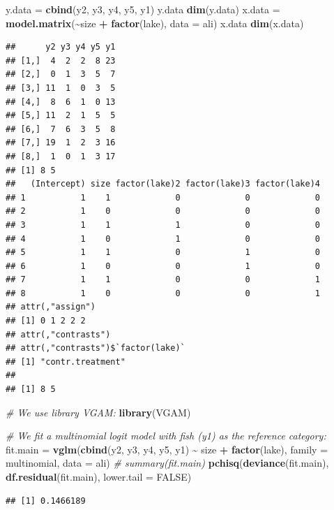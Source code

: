 \documentclass[
  ignorenonframetext,
]{beamer}
\newenvironment{Shaded}{\begin{snugshade}}{\end{snugshade}}
\newcommand{\AttributeTok}[1]{\textcolor[rgb]{0.13,0.29,0.53}{#1}}
\newcommand{\CommentTok}[1]{\textcolor[rgb]{0.56,0.35,0.01}{\textit{#1}}}
\newcommand{\ConstantTok}[1]{\textcolor[rgb]{0.56,0.35,0.01}{#1}}
\newcommand{\FunctionTok}[1]{\textcolor[rgb]{0.13,0.29,0.53}{\textbf{#1}}}
\newcommand{\NormalTok}[1]{#1}
\newcommand{\OtherTok}[1]{\textcolor[rgb]{0.56,0.35,0.01}{#1}}
\newcommand{\SpecialCharTok}[1]{\textcolor[rgb]{0.81,0.36,0.00}{\textbf{#1}}}
\begin{document}
\begin{frame}[fragile]
\begin{Shaded}
\begin{Highlighting}[]
\NormalTok{y.data }\OtherTok{=} \FunctionTok{cbind}\NormalTok{(y2, y3, y4, y5, y1)}
\NormalTok{y.data}
\FunctionTok{dim}\NormalTok{(y.data)}
\NormalTok{x.data }\OtherTok{=} \FunctionTok{model.matrix}\NormalTok{(}\SpecialCharTok{\textasciitilde{}}\NormalTok{size }\SpecialCharTok{+} \FunctionTok{factor}\NormalTok{(lake), }\AttributeTok{data =}\NormalTok{ ali)}
\NormalTok{x.data}
\FunctionTok{dim}\NormalTok{(x.data)}
\end{Highlighting}
\end{Shaded}

\begin{verbatim}
##      y2 y3 y4 y5 y1
## [1,]  4  2  2  8 23
## [2,]  0  1  3  5  7
## [3,] 11  1  0  3  5
## [4,]  8  6  1  0 13
## [5,] 11  2  1  5  5
## [6,]  7  6  3  5  8
## [7,] 19  1  2  3 16
## [8,]  1  0  1  3 17
## [1] 8 5
##   (Intercept) size factor(lake)2 factor(lake)3 factor(lake)4
## 1           1    1             0             0             0
## 2           1    0             0             0             0
## 3           1    1             1             0             0
## 4           1    0             1             0             0
## 5           1    1             0             1             0
## 6           1    0             0             1             0
## 7           1    1             0             0             1
## 8           1    0             0             0             1
## attr(,"assign")
## [1] 0 1 2 2 2
## attr(,"contrasts")
## attr(,"contrasts")$`factor(lake)`
## [1] "contr.treatment"
## 
## [1] 8 5
\end{verbatim}
\end{frame}

\begin{frame}[fragile]
\begin{Shaded}
\begin{Highlighting}[]
\CommentTok{\# We use library VGAM:}
\FunctionTok{library}\NormalTok{(VGAM)}

\CommentTok{\# We fit a multinomial logit model with fish (y1) as the reference category:}
\NormalTok{fit.main }\OtherTok{=} \FunctionTok{vglm}\NormalTok{(}\FunctionTok{cbind}\NormalTok{(y2, y3, y4, y5, y1) }\SpecialCharTok{\textasciitilde{}}\NormalTok{ size }\SpecialCharTok{+} \FunctionTok{factor}\NormalTok{(lake), }\AttributeTok{family =}\NormalTok{ multinomial,}
    \AttributeTok{data =}\NormalTok{ ali)}
\CommentTok{\# summary(fit.main)}
\FunctionTok{pchisq}\NormalTok{(}\FunctionTok{deviance}\NormalTok{(fit.main), }\FunctionTok{df.residual}\NormalTok{(fit.main), }\AttributeTok{lower.tail =} \ConstantTok{FALSE}\NormalTok{)}
\end{Highlighting}
\end{Shaded}

\begin{verbatim}
## [1] 0.1466189
\end{verbatim}
\end{frame}
\end{document}
